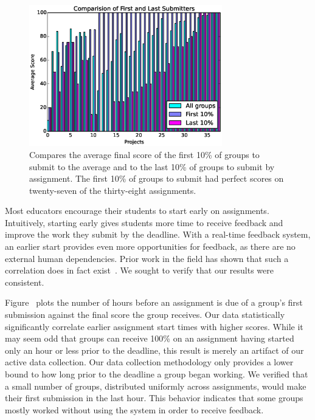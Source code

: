 \begin{figure}[!t]
\centering
\includegraphics[width=3.3in]{graphs/Comparision_of_First_and_Last_Submitters.eps}
\caption{Compares the average final score of the first 10\% of groups to submit
  to the average and to the last 10\% of groups to submit by assignment. The
  first 10\% of groups to submit had perfect scores on twenty-seven of the
  thirty-eight assignments.}
\end{figure}

Most educators encourage their students to start early on
assignments. Intuitively, starting early gives students more time to receive
feedback and improve the work they submit by the deadline. With a real-time
feedback system, an earlier start provides even more opportunities for
feedback, as there are no external human dependencies. Prior work in the field
has shown that such a correlation does in fact
exist~\cite{Spacco:2013:TIP:2462476.2465594,
  Edwards:2009:CEI:1584322.1584325}. We sought to verify that our results were
consistent.

Figure~ plots the number of hours before an
assignment is due of a group's first submission against the final score the
group receives. Our data statistically significantly correlate earlier
assignment start times with higher scores. While it may seem odd that groups
can receive 100\% on an assignment having started only an hour or less prior to
the deadline, this result is merely an artifact of our active data
collection. Our data collection methodology only provides a lower bound to how
long prior to the deadline a group began working. We verified that a small
number of groups, distributed uniformly across assignments, would make their
first submission in the last hour. This behavior indicates that some groups
mostly worked without using the system in order to receive feedback.

